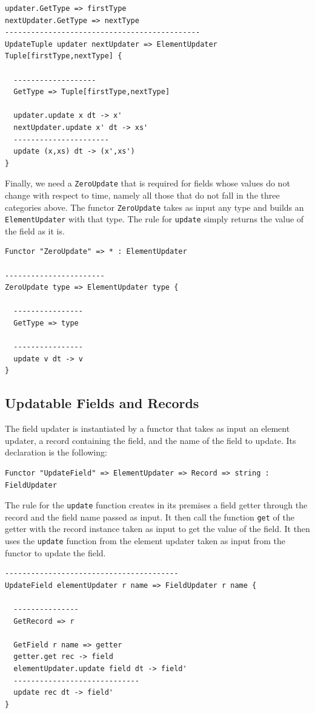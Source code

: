 \begin{lstlisting}
updater.GetType => firstType
nextUpdater.GetType => nextType
---------------------------------------------
UpdateTuple updater nextUpdater => ElementUpdater Tuple[firstType,nextType] {

  -------------------
  GetType => Tuple[firstType,nextType]

  updater.update x dt -> x'
  nextUpdater.update x' dt -> xs'
  ----------------------
  update (x,xs) dt -> (x',xs')
}
\end{lstlisting}

Finally, we need a \texttt{ZeroUpdate} that is required for fields whose values do not change with respect to time, namely all those that do not fall in the three categories above. The functor \texttt{ZeroUpdate} takes as input any type and builds an \texttt{ElementUpdater} with that type. The rule for \texttt{update} simply returns the value of the field as it is.

\begin{lstlisting}
Functor "ZeroUpdate" => * : ElementUpdater

-----------------------
ZeroUpdate type => ElementUpdater type {

  ----------------
  GetType => type

  ----------------
  update v dt -> v
}
\end{lstlisting}

\subsection{Updatable Fields and Records}
The field updater is instantiated by a functor that takes as input an element updater, a record containing the field, and the name of the field to update. Its declaration is the following:

\begin{lstlisting}
Functor "UpdateField" => ElementUpdater => Record => string : FieldUpdater
\end{lstlisting} 

\noindent
The rule for the \texttt{update} function creates in its premises a field getter through the record and the field name passed as input. It then call the function \texttt{get} of the getter with the record instance taken as input to get the value of the field. It then uses the \texttt{update} function from the element updater taken as input from the functor to update the field.

\begin{lstlisting}
----------------------------------------
UpdateField elementUpdater r name => FieldUpdater r name {

  ---------------
  GetRecord => r

  GetField r name => getter
  getter.get rec -> field
  elementUpdater.update field dt -> field' 
  -----------------------------
  update rec dt -> field'
}
\end{lstlisting}

